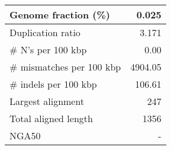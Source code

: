 \documentclass[12pt,a4paper]{article}
\begin{document}
\begin{table}[ht]
\begin{center}
\begin{tabular}{|l*{1}{|r}|}
Genome fraction (\%) & 0.025 \\ \hline
Duplication ratio & 3.171 \\ \hline
\# N's per 100 kbp & 0.00 \\ \hline
\# mismatches per 100 kbp & 4904.05 \\ \hline
\# indels per 100 kbp & 106.61 \\ \hline
Largest alignment & 247 \\ \hline
Total aligned length & 1356 \\ \hline
NGA50 & - \\ \hline
\end{tabular}
\end{center}
\end{table}
\end{document}
